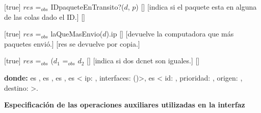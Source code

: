 \begin{Interfaz}
  [true]
  {$res$ =$_{obs}$ IDpaqueteEnTransito?($d$, $p$)}%
  []
  [indica si el paquete esta en alguna de las colas dado el ID.]
  []
  
  [true]
  {$res$ =$_{obs}$ laQueMasEnvio($d$).ip}%
  []
  [devuelve la computadora que m\'as paquetes envi\'o.]
  [res se devuelve por copia.]  
  
  [true]
  {$res$ =$_{obs}$ ($d_1$ =$_{obs}$ $d_2$}%
  []
  [indica si dos dcnet son iguales.]
  []  
  
  \textbf{donde:} \newline  
    es , \newline
    es , \newline
    es , \newline
    es < ip: , interfaces: ()>, \newline
    es < id: , prioridad: , origen: , destino:  >.
   
\end{Interfaz}

\textbf{} %

\textbf{Especificaci\'on de las operaciones auxiliares utilizadas en la interfaz}

